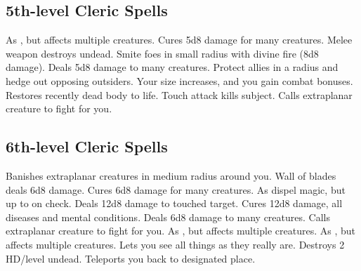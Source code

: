 \subsection{5th-level Cleric Spells}
\begin{spelllist}
 As , but affects multiple creatures.
 Cures 5d8 damage for many creatures.
 Melee weapon destroys undead.
 Smite foes in small radius with divine fire (8d8 damage).
 Deals 5d8 damage to many creatures.
 Protect allies in a \areamed radius and hedge out opposing outsiders.
 Your size increases, and you gain combat bonuses.
 Restores recently dead body to life.
 Touch attack kills subject.
 Calls extraplanar creature to fight for you.
\end{spelllist}

\subsection{6th-level Cleric Spells}
\begin{spelllist}
 Banishes extraplanar creatures in medium radius around you.
 Wall of blades deals 6d8 damage.
 Cures 6d8 damage for many creatures.
 As dispel magic, but up to  on check.
 Deals 12d8 damage to touched target.
 Cures 12d8 damage, all diseases and mental conditions.
 Deals 6d8 damage to many creatures.
 Calls extraplanar creature to fight for you.
 As , but affects multiple creatures.
 As , but affects multiple creatures.
\M Lets you see all things as they really are.
\M Destroys 2 HD/level undead.
 Teleports you back to designated place.
\end{spelllist}

